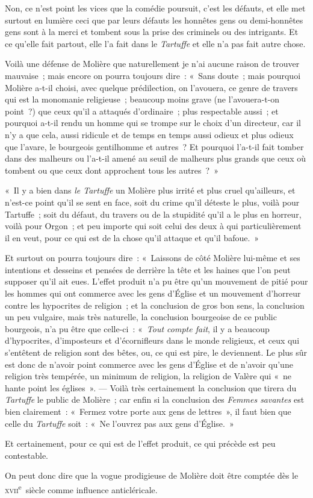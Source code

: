 \documentclass[french,twoside]{book} %
\begin{document}
Non, ce n’est point les vices que la comédie poursuit, c’est les défauts, et elle met surtout en lumière ceci que par leurs défauts les honnêtes gens ou demi-honnêtes gens sont à la merci et tombent sous la prise des criminels ou des intrigants. Et ce qu’elle fait partout, elle l’a fait dans le \emph{Tartuffe} et elle n’a pas fait autre chose.\par
Voilà une défense de Molière que naturellement je n’ai aucune raison de trouver mauvaise ; mais encore on pourra toujours dire : « Sans doute ; mais pourquoi Molière a-t-il choisi, avec quelque prédilection, on l’avouera, ce genre de travers qui est la monomanie religieuse ; beaucoup moins grave (ne l’avouera-t-on point ?) que ceux qu’il a attaqués d’ordinaire ; plus respectable aussi ; et pourquoi a-t-il rendu un homme qui se trompe sur le choix d’un directeur, car il n’y a que cela, aussi ridicule et de temps en temps aussi odieux et plus odieux que l’avare, le bourgeois gentilhomme et autres ? Et pourquoi l’a-t-il fait tomber dans des  malheurs ou l’a-t-il amené au seuil de malheurs plus grands que ceux où tombent ou que ceux dont approchent tous les autres ? »\par
« Il y a bien dans \emph{le Tartuffe} un Molière plus irrité et plus cruel qu’ailleurs, et n’est-ce point qu’il se sent en face, soit du crime qu’il déteste le plus, voilà pour Tartuffe ; soit du défaut, du travers ou de la stupidité qu’il a le plus en horreur, voilà pour Orgon ; et peu importe qui soit celui des deux à qui particulièrement il en veut, pour ce qui est de la chose qu’il attaque et qu’il bafoue. »\par
Et surtout on pourra toujours dire : « Laissons de côté Molière lui-même et ses intentions et desseins et pensées de derrière la tête et les haines que l’on peut supposer qu’il ait eues. L’effet produit n’a pu être qu’un mouvement de pitié pour les hommes qui ont commerce avec les gens d’Église et un mouvement d’horreur contre les hypocrites de religion ; et la conclusion de gros bon sens, la conclusion un peu vulgaire, mais très naturelle, la conclusion bourgeoise de ce public bourgeois, n’a pu être que celle-ci : « {\itshape Tout compte fait}, il y a beaucoup d’hypocrites, d’imposteurs et d’écornifleurs dans le monde religieux, et ceux qui s’entêtent de religion sont des bêtes, ou, ce qui est pire, le deviennent. Le plus sûr est donc de n’avoir point commerce avec les  gens d’Église et de n’avoir qu’une religion très tempérée, un minimum de religion, la religion de Valère qui « ne hante point les églises ». — Voilà très certainement la conclusion que tirera du \emph{Tartuffe} le public de Molière ; car enfin si la conclusion des \emph{Femmes savantes} est bien clairement : « Fermez votre porte aux gens de lettres », il faut bien que celle du \emph{Tartuffe} soit : « Ne l’ouvrez pas aux gens d’Église. »\par
Et certainement, pour ce qui est de l’effet produit, ce qui précède est peu contestable.\par
On peut donc dire que la vogue prodigieuse de Molière doit être comptée dès le \textsc{xvii}\textsuperscript{e} siècle comme influence anticléricale.\par
\end{document}
